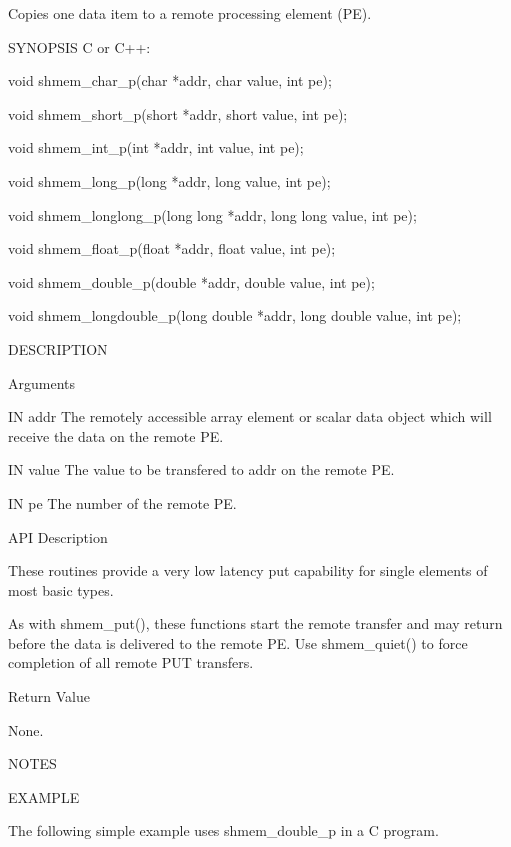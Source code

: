        Copies one data item to a remote processing element (PE).

SYNOPSIS
       C or C++:

	  void shmem_char_p(char *addr, char value, int pe);

	  void shmem_short_p(short *addr, short value, int pe);

	  void shmem_int_p(int *addr, int value, int pe);

	  void shmem_long_p(long *addr, long value, int pe);

	  void shmem_longlong_p(long long *addr, long long value, int pe);

	  void shmem_float_p(float *addr, float value, int pe);

	  void shmem_double_p(double *addr, double value, int pe);

	  void	shmem_longdouble_p(long	 double	 *addr, long double value, int
	  pe);

DESCRIPTION

Arguments

	IN       addr	 The  remotely	accessible array element or scalar data object
		 which will receive the data on the remote PE.

       IN	value	 The value to be transfered to addr on the remote PE.

       IN	pe	 The number of the remote PE.

API Description

       These routines provide a very low latency  put  capability  for	single
       elements of most basic types.

       As with shmem_put(), these functions start the remote transfer and may
       return	before	 the   data  is	 delivered  to	the  remote  PE.   Use
       shmem_quiet() to force completion of all remote PUT transfers.

Return Value

	None.

NOTES

EXAMPLE

	The  following  simple  example	uses  shmem_double_p  in a C program.	 

	
